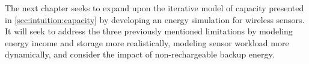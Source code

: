 The next chapter seeks to expand upon the iterative model of capacity presented in \cref{sec:intuition:capacity} by developing an energy simulation for wireless sensors.
It will seek to address the three previously mentioned limitations by modeling energy income and storage more realistically, modeling sensor workload more dynamically, and consider the impact of non-rechargeable backup energy.

%
%
%
%
%
%
%
%
%
%
%
%
%
%
%
%
%
%
%
%
%


